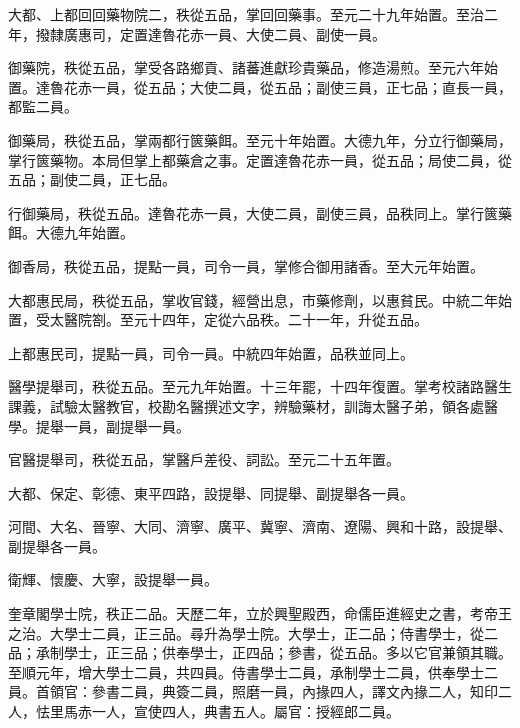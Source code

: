 \begin{pinyinscope}
 大都、上都回回藥物院二，秩從五品，掌回回藥事。至元二十九年始置。至治二年，撥隸廣惠司，定置達魯花赤一員、大使二員、副使一員。



 御藥院，秩從五品，掌受各路鄉貢、諸蕃進獻珍貴藥品，修造湯煎。至元六年始置。達魯花赤一員，從五品；大使二員，從五品；副使三員，正七品；直長一員，都監二員。



 御藥局，秩從五品，掌兩都行篋藥餌。至元十年始置。大德九年，分立行御藥局，掌行篋藥物。本局但掌上都藥倉之事。定置達魯花赤一員，從五品；局使二員，從五品；副使二員，正七品。



 行御藥局，秩從五品。達魯花赤一員，大使二員，副使三員，品秩同上。掌行篋藥餌。大德九年始置。



 御香局，秩從五品，提點一員，司令一員，掌修合御用諸香。至大元年始置。



 大都惠民局，秩從五品，掌收官錢，經營出息，市藥修劑，以惠貧民。中統二年始置，受太醫院劄。至元十四年，定從六品秩。二十一年，升從五品。



 上都惠民司，提點一員，司令一員。中統四年始置，品秩並同上。



 醫學提舉司，秩從五品。至元九年始置。十三年罷，十四年復置。掌考校諸路醫生課義，試驗太醫教官，校勘名醫撰述文字，辨驗藥材，訓誨太醫子弟，領各處醫學。提舉一員，副提舉一員。



 官醫提舉司，秩從五品，掌醫戶差役、詞訟。至元二十五年置。



 大都、保定、彰德、東平四路，設提舉、同提舉、副提舉各一員。



 河間、大名、晉寧、大同、濟寧、廣平、冀寧、濟南、遼陽、興和十路，設提舉、副提舉各一員。



 衛輝、懷慶、大寧，設提舉一員。



 奎章閣學士院，秩正二品。天歷二年，立於興聖殿西，命儒臣進經史之書，考帝王之治。大學士二員，正三品。尋升為學士院。大學士，正二品；侍書學士，從二品；承制學士，正三品；供奉學士，正四品；參書，從五品。多以它官兼領其職。至順元年，增大學士二員，共四員。侍書學士二員，承制學士二員，供奉學士二員。首領官：參書二員，典簽二員，照磨一員，內掾四人，譯文內掾二人，知印二人，怯里馬赤一人，宣使四人，典書五人。屬官：授經郎二員。




\end{pinyinscope}

